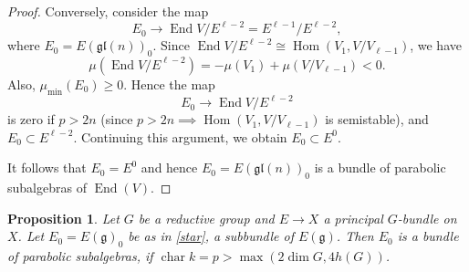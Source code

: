 \documentclass[12pt]{article}
\newtheorem{proposition}{Proposition}[section]
\begin{document}
\begin{proof}
Conversely, consider the map
\[
E_0 \to \operatorname{End} V/E^{\ell-2} = E^{\ell-1}/E^{\ell-2},
\]
where $E_0 = E(\mathfrak{gl}(n))_0$. Since $\operatorname{End} V/E^{\ell-2} \cong \operatorname{Hom}(V_1, V/V_{\ell-1})$, we have
\[
\mu(\operatorname{End} V/E^{\ell-2}) = -\mu(V_1) + \mu(V/V_{\ell-1}) < 0.
\]
Also, $\mu_{\min}(E_0) \geq 0$. Hence the map
\[
E_0 \to \operatorname{End} V/E^{\ell-2}
\]
is zero if $p > 2n$ (since $p > 2n \implies \operatorname{Hom}(V_1, V/V_{\ell-1})$ is semistable), and $E_0 \subset E^{\ell-2}$. Continuing this argument, we obtain $E_0 \subset E^0$.

It follows that $E_0 = E^0$ and hence $E_0 = E(\mathfrak{gl}(n))_0$ is a bundle of parabolic subalgebras of $\operatorname{End}(V)$.
\end{proof}

\begin{proposition}\label{prop:2.2}
Let $G$ be a reductive group and $E \to X$ a principal $G$-bundle on $X$. Let $E_0 = E(\mathfrak{g})_0$ be as in \eqref{star}, a subbundle of $E(\mathfrak{g})$. Then $E_0$ is a bundle of parabolic subalgebras, if $\operatorname{char} k = p > \max(2 \dim G, 4h(G))$.
\end{proposition}
\end{document}
